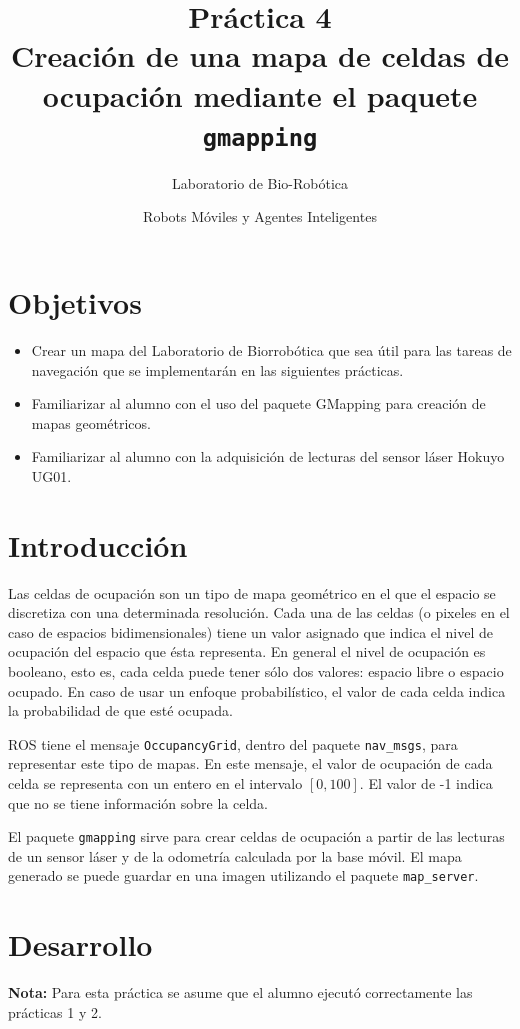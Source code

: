 \documentclass[letterpaper,12pt]{article}
\title{Práctica 4  \\ Creación de una mapa de celdas de ocupación mediante el paquete \texttt{gmapping}}
\author{Laboratorio de Bio-Robótica}
\date{Robots Móviles y Agentes Inteligentes}
\begin{document}
\renewcommand{\tablename}{Tabla}
\maketitle
\section*{Objetivos}
\begin{itemize}
\item Crear un mapa del Laboratorio de Biorrobótica que sea útil para las tareas de navegación que se implementarán en las siguientes prácticas. 
\item Familiarizar al alumno con el uso del paquete GMapping para creación de mapas geométricos.
\item Familiarizar al alumno con la adquisición de lecturas del sensor láser Hokuyo UG01.
\end{itemize}

\section{Introducción}
Las celdas de ocupación son un tipo de mapa geométrico en el que el espacio se discretiza con una determinada resolución. Cada una de las celdas (o pixeles en el caso de espacios bidimensionales) tiene un valor asignado que indica el nivel de ocupación del espacio que ésta representa. En general el nivel de ocupación es booleano, esto es, cada celda puede tener sólo dos valores: espacio libre o espacio ocupado. En caso de usar un enfoque probabilístico, el valor de cada celda indica la probabilidad de que esté ocupada. 

ROS tiene el mensaje \texttt{OccupancyGrid}, dentro del paquete \texttt{nav\_msgs}, para representar este tipo de mapas. En este mensaje, el valor de ocupación de cada celda se representa con un entero en el intervalo $[0,100]$. El valor de -1 indica que no se tiene información sobre la celda. 

El paquete \texttt{gmapping} sirve para crear celdas de ocupación a partir de las lecturas de un sensor láser y de la odometría calculada por la base móvil. El mapa generado se puede guardar en una imagen utilizando el paquete \texttt{map\_server}.

\section{Desarrollo}
\textbf{Nota:} Para esta práctica se asume que el alumno ejecutó correctamente las prácticas 1 y 2.
\end{document}
